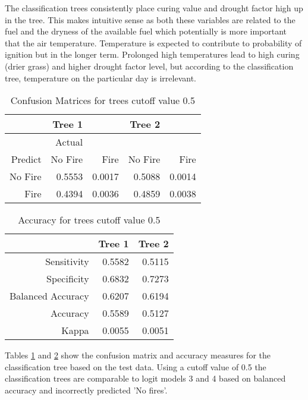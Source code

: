 \documentclass[11pt,a4paper]{article}
\begin{document}
The classification trees consistently place  curing value and drought factor high up in the tree. This makes intuitive sense as both these variables are related to the fuel and the dryness of the available fuel which potentially is more important that the air temperature. Temperature is expected to contribute to probability of ignition but in the longer term. Prolonged high temperatures lead to high curing (drier grass) and higher drought factor level, but according to the classification tree, temperature on the particular day is irrelevant. 

\begin{table}[!ht]
	\centering
	\begin{tabular}{r|rr|rr}
		\toprule
		  & Tree 1 &  & Tree 2 & \\ 
		\midrule
		& Actual   &  &  &   \\ 
		Predict  & No Fire & Fire & No Fire & Fire\\ 
		\midrule
No Fire  & 0.5553 & 0.0017 & 0.5088 & 0.0014 \\ 
Fire  & 0.4394 & 0.0036 & 0.4859 & 0.0038 \\ 
		\bottomrule
	\end{tabular}
	\caption{Confusion Matrices for trees cutoff value 0.5}
	\label{table:tcm2}
\end{table}


\begin{table}[!ht]
	\centering
	\begin{tabular}{rrr}
		\toprule
		 & Tree 1 & Tree 2 \\ 
		\midrule
		Sensitivity  & 0.5582 & 0.5115 \\ 
		Specificity & 0.6832 & 0.7273 \\  
		Balanced Accuracy  & 0.6207 & 0.6194 \\ 
		Accuracy  & 0.5589 & 0.5127 \\ 
		Kappa & 0.0055 & 0.0051 \\ 
		\bottomrule
	\end{tabular}
	\caption{Accuracy for trees cutoff value 0.5}
	\label{table:tacc2}
\end{table}

Tables \ref{table:tcm2} and \ref{table:tacc2} show the confusion matrix and accuracy measures for the classification tree based on the test data. Using a cutoff value of 0.5 the classification trees are comparable to logit models 3 and 4 based on balanced accuracy and incorrectly predicted 'No fires'. 
\end{document}
